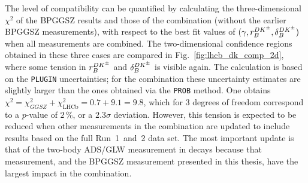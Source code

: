 The level of compatibility can be quantified by calculating the three-dimensional $\chi^2$ of the BPGGSZ results and those of the \lhcb combination (without the earlier BPGGSZ measurements), with respect to the best fit values of $(\gamma, r_B^{{{D}{{K}^\pm}}}, \delta_B^{{{D}{{K}^\pm}}})$ when all measurements are combined. The two-dimensional confidence regions obtained in these three cases are compared in Fig.~\ref{fig:lhcb_dk_comp_2d}, where some tension in $r_B^{{{D}{{K}^\pm}}}$ and $\delta_B^{{{D}{{K}^\pm}}}$ is visible again. The calculation is based on the \texttt{PLUGIN} uncertainties; for the \lhcb combination these uncertainty estimates are slightly larger than the ones obtained via the \texttt{PROB} method. One obtains $\chi^2=\chi^2_{GGSZ}+\chi^2_\text{LHCb} = 0.7 + 9.1 = 9.8$, which for 3 degrees of freedom correspond to a $p$-value of $2\,\%$, or a $2.3\sigma$ deviation. However, this tension is expected to be reduced when other measurements in the \lhcb combination are updated to include results based on the full Run~1~and~2 data set. The most important update is that of the two-body ADS/GLW measurement in \BtoDK decays because that measurement, and the BPGGSZ measurement presented in this thesis, have the largest impact in the combination.


